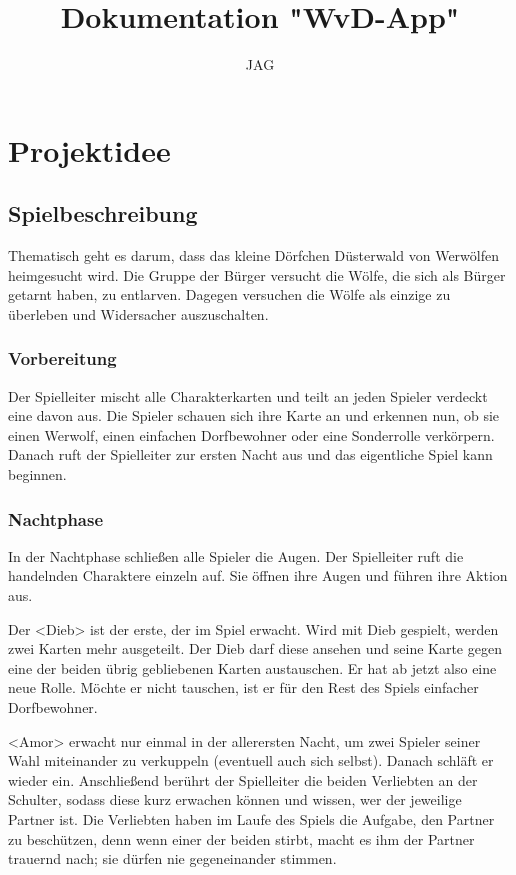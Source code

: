 \documentclass[12pt]{article}
\title{Dokumentation "WvD-App"}
\author{JAG}
\begin{document}
\maketitle
\tableofcontents
\setcounter{tocdepth}{3}

\section{Projektidee}

\subsection{Spielbeschreibung}
Thematisch geht es darum, dass das kleine Dörfchen Düsterwald von Werwölfen heimgesucht wird.
Die Gruppe der Bürger versucht die Wölfe, die sich als Bürger getarnt haben, zu entlarven.
Dagegen versuchen die Wölfe als einzige zu überleben und Widersacher auszuschalten.

\subsubsection{Vorbereitung}
Der Spielleiter mischt alle Charakterkarten und teilt an jeden Spieler verdeckt eine davon aus.
Die Spieler schauen sich ihre Karte an und erkennen nun, ob sie einen Werwolf, einen einfachen
Dorfbewohner oder eine Sonderrolle verkörpern. Danach ruft der Spielleiter zur ersten Nacht aus und
das eigentliche Spiel kann beginnen.

\subsubsection{Nachtphase}
In der Nachtphase schließen alle Spieler die Augen. Der Spielleiter ruft die handelnden Charaktere
einzeln auf. Sie öffnen ihre Augen und führen ihre Aktion aus.

Der <Dieb> ist der erste, der im Spiel erwacht. Wird mit Dieb gespielt, werden zwei Karten mehr
ausgeteilt. Der Dieb darf diese ansehen und seine Karte gegen eine der beiden übrig gebliebenen
Karten austauschen. Er hat ab jetzt also eine neue Rolle. Möchte er nicht tauschen, ist er für den
Rest des Spiels einfacher Dorfbewohner.

<Amor> erwacht nur einmal in der allerersten Nacht, um zwei Spieler seiner Wahl miteinander zu
verkuppeln (eventuell auch sich selbst). Danach schläft er wieder ein. Anschließend berührt der
Spielleiter die beiden Verliebten an der Schulter, sodass diese kurz erwachen können und wissen,
wer der jeweilige Partner ist. Die Verliebten haben im Laufe des Spiels die Aufgabe, den Partner
zu beschützen, denn wenn einer der beiden stirbt, macht es ihm der Partner trauernd nach; sie
dürfen nie gegeneinander stimmen.
\end{document}
